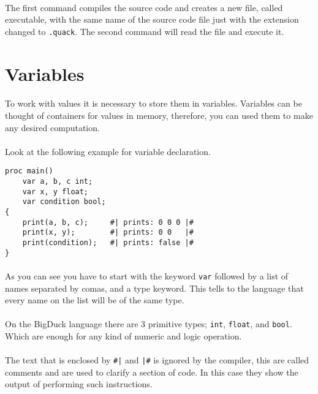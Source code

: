 \paragraph{} The first command compiles the source code and creates a new file,
called executable, with the same name of the source code file just with the
extension changed to \texttt{.quack}. The second command will read the file
and execute it.

\section{Variables}
\paragraph{} To work with values it is necessary to store them in variables.
Variables can be thought of containers for values in memory, therefore, you
can used them to make any desired computation.

\paragraph{} Look at the following example for variable declaration.
\begin{verbatim}
proc main()
    var a, b, c int;
    var x, y float;
    var condition bool;
{
    print(a, b, c);     #| prints: 0 0 0 |#
    print(x, y);        #| prints: 0 0   |#
    print(condition);   #| prints: false |#
}
\end{verbatim}

\paragraph{} As you can see you have to start with the keyword \texttt{var}
followed by a list of names separated by comas, and a type keyword. This tells
to the language that every name on the list will be of the same type.

\paragraph{} On the BigDuck language there are 3 primitive types; \texttt{int},
\texttt{float}, and \texttt{bool}. Which are enough for any kind of numeric
and logic operation.

\paragraph{} The text that is enclosed by \texttt{\#|} and \texttt{|\#} is
ignored by the compiler, this are called comments and are used to clarify a
section of code. In this case they show the output of performing such
instructions.

